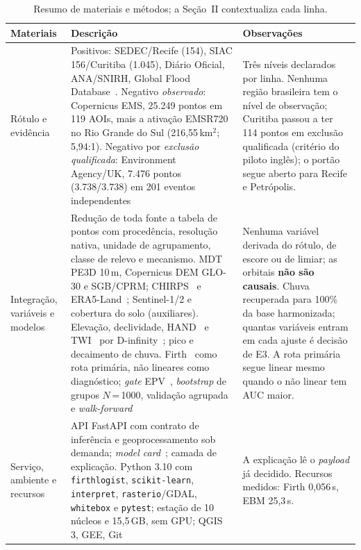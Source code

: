 \documentclass[conference]{IEEEtran}
\begin{document}
\begin{table}[!t]
\caption{Resumo de materiais e métodos; a Seção~II contextualiza cada linha.}
\label{tab:mm}
\centering
\renewcommand{\arraystretch}{0.95}
\scriptsize
\begin{tabular}{@{}>{\raggedright\arraybackslash}p{2.05cm}>{\raggedright\arraybackslash}p{7.6cm}>{\raggedright\arraybackslash}p{6.5cm}@{}}
\toprule
\textbf{Materiais} & \textbf{Descrição} & \textbf{Observações} \\
\midrule
Rótulo e evidência &
Positivos: SEDEC/Recife (154), SIAC 156/Curitiba (1.045), Diário Oficial,
ANA/SNIRH, Global Flood Database~\cite{tellman2021}. Negativo \emph{observado}:
Copernicus EMS, 25.249 pontos em 119 AOIs, mais a ativação EMSR720 no Rio Grande do
Sul (216,55\,km$^2$; 5,94:1). Negativo por \emph{exclusão qualificada}: Environment
Agency/UK, 7.476 pontos (3.738/3.738) em 201 eventos independentes &
Três níveis declarados por linha. Nenhuma região brasileira tem o nível de
observação; Curitiba passou a ter 114 pontos em exclusão qualificada
(critério do piloto inglês); o portão segue aberto para Recife e
Petrópolis. \\
Integração, variáveis e modelos &
Redução de toda fonte a tabela de pontos com procedência, resolução nativa, unidade
de agrupamento, classe de relevo e mecanismo. MDT PE3D 10\,m, Copernicus DEM GLO-30 e
SGB/CPRM; CHIRPS~\cite{funk2015} e ERA5-Land~\cite{munoz2021}; Sentinel-1/2 e cobertura
do solo (auxiliares). Elevação, declividade, HAND~\cite{renno2008} e TWI~\cite{beven1979}
por D-infinity~\cite{tarboton1997}; pico e decaimento de chuva. Firth~\cite{firth1993}
como rota primária, não lineares como diagnóstico; \emph{gate} EPV~\cite{peduzzi1996},
\emph{bootstrap} de grupos $N$\,=\,1000, validação agrupada e \emph{walk-forward} &
Nenhuma variável derivada do rótulo, de escore ou de limiar; as orbitais \textbf{não
são causais}. Chuva recuperada para 100\% da base harmonizada; quantas variáveis
entram em cada ajuste é decisão de E3. A rota primária segue linear mesmo quando o
não linear tem AUC maior. \\
Serviço, ambiente e recursos &
API FastAPI com contrato de inferência e geoprocessamento sob demanda; \emph{model
card}~\cite{mitchell2019}; camada de explicação. Python 3.10 com \texttt{firthlogist},
\texttt{scikit-learn}, \texttt{interpret}, \texttt{rasterio}/GDAL, \texttt{whitebox} e
\texttt{pytest}; estação de 10 núcleos e 15,5\,GB, sem GPU; QGIS 3, GEE, Git &
A explicação lê o \emph{payload} já decidido. Recursos medidos: Firth 0,056\,s,
EBM 25,3\,s. \\
\bottomrule
\end{tabular}
\end{table}
\end{document}
